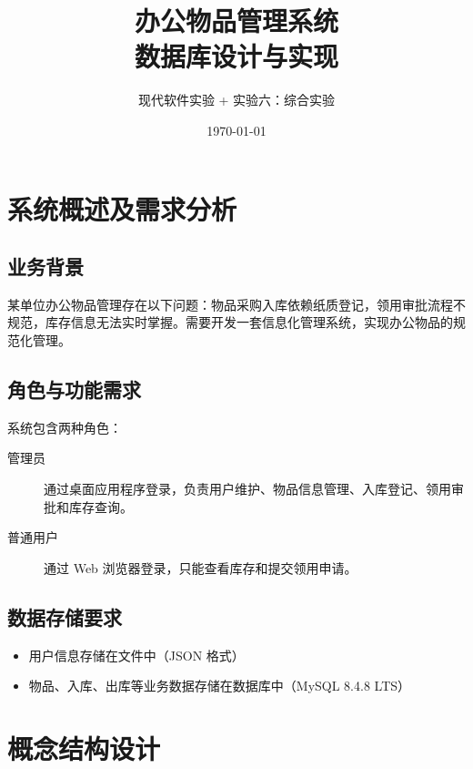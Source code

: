 \documentclass[12pt,a4paper]{ctexart}
\title{\textbf{办公物品管理系统\\数据库设计与实现}}
\author{现代软件实验 + 实验六：综合实验}
\date{\today}
\begin{document}
\maketitle
\tableofcontents
\newpage

\section{系统概述及需求分析}

\subsection{业务背景}

某单位办公物品管理存在以下问题：物品采购入库依赖纸质登记，领用审批流程不规范，库存信息无法实时掌握。需要开发一套信息化管理系统，实现办公物品的规范化管理。

\subsection{角色与功能需求}

系统包含两种角色：

\begin{description}
    \item[管理员] 通过桌面应用程序登录，负责用户维护、物品信息管理、入库登记、领用审批和库存查询。
    \item[普通用户] 通过 Web 浏览器登录，只能查看库存和提交领用申请。
\end{description}

\subsection{数据存储要求}

\begin{itemize}
    \item 用户信息存储在文件中（JSON 格式）
    \item 物品、入库、出库等业务数据存储在数据库中（MySQL 8.4.8 LTS）
\end{itemize}

\section{概念结构设计}
\end{document}
